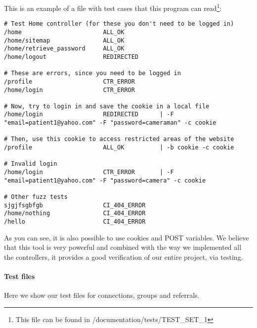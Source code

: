 This is an example of a file with test cases that this program can read\footnote{This file can be found in /documentation/tests/TEST\_SET\_1}:
\begin{verbatim}
# Test Home controller (for these you don't need to be logged in)
/home						ALL_OK
/home/sitemap				ALL_OK
/home/retrieve_password		ALL_OK
/home/logout				REDIRECTED

# These are errors, since you need to be logged in
/profile					CTR_ERROR
/home/login					CTR_ERROR

# Now, try to login in and save the cookie in a local file
/home/login					REDIRECTED		| -F "email=patient1@yahoo.com" -F "password=cameraman" -c cookie

# Then, use this cookie to access restricted areas of the website
/profile					ALL_OK			| -b cookie -c cookie

# Invalid login
/home/login					CTR_ERROR		| -F "email=patient1@yahoo.com" -F "password=camera" -c cookie

# Other fuzz tests
sjgjfsgbfgb					CI_404_ERROR
/home/nothing				CI_404_ERROR
/hello						CI_404_ERROR
\end{verbatim}
As you can see, it is also possible to use cookies and POST variables. We believe that this tool is very powerful and combined with the way we implemented all the controllers, it provides a good verification of our entire project, via testing.

\paragraph{Test files}
Here we show our test files for connections, groups and referrals.

